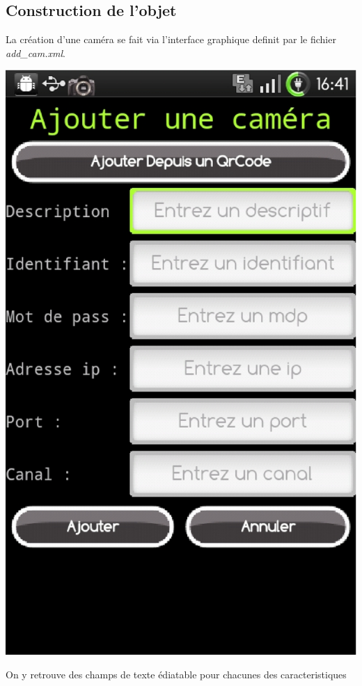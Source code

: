 \documentclass[a4paper,10pt]{report}
\begin{document}
\subsection{Construction de l'objet}
La création d'une caméra se fait via l'interface graphique definit par le
fichier \textit{add\_cam.xml}.\\
\begin{center}\includegraphics[scale=0.5]{Images/addCamScreenShot.eps} \newline
\end{center} 
On y retrouve des champs de texte édiatable pour chacunes des caracteristiques
\end{document}
